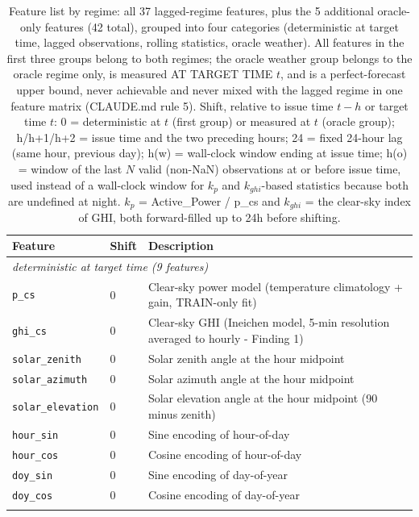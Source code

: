 \begin{table}[t]
  \centering
  \scriptsize
  \caption{Feature list by regime: all 37 lagged-regime features, plus the 5 additional oracle-only features (42 total), grouped into four categories (deterministic at target time, lagged observations, rolling statistics, oracle weather). All features in the first three groups belong to both regimes; the oracle weather group belongs to the oracle regime only, is measured AT TARGET TIME $t$, and is a perfect-forecast upper bound, never achievable and never mixed with the lagged regime in one feature matrix (CLAUDE.md rule 5). Shift, relative to issue time $t-h$ or target time $t$: 0 = deterministic at $t$ (first group) or measured at $t$ (oracle group); h/h+1/h+2 = issue time and the two preceding hours; 24 = fixed 24-hour lag (same hour, previous day); h(w) = wall-clock window ending at issue time; h(o) = window of the last $N$ valid (non-NaN) observations at or before issue time, used instead of a wall-clock window for $k_p$ and $k_{ghi}$-based statistics because both are undefined at night. $k_p$ = Active\_Power / p\_cs and $k_{ghi}$ = the clear-sky index of GHI, both forward-filled up to 24h before shifting.}
  \label{tab:T2}
  \begin{tabular}{ll p{4.5cm}}
    \toprule
    Feature & Shift & Description \\
    \midrule
    \multicolumn{3}{l}{\textit{deterministic at target time (9 features)}} \\
    \texttt{p\_cs} & 0 & Clear-sky power model (temperature climatology + gain, TRAIN-only fit) \\
    \texttt{ghi\_cs} & 0 & Clear-sky GHI (Ineichen model, 5-min resolution averaged to hourly - Finding 1) \\
    \texttt{solar\_zenith} & 0 & Solar zenith angle at the hour midpoint \\
    \texttt{solar\_azimuth} & 0 & Solar azimuth angle at the hour midpoint \\
    \texttt{solar\_elevation} & 0 & Solar elevation angle at the hour midpoint (90 minus zenith) \\
    \texttt{hour\_sin} & 0 & Sine encoding of hour-of-day \\
    \texttt{hour\_cos} & 0 & Cosine encoding of hour-of-day \\
    \texttt{doy\_sin} & 0 & Sine encoding of day-of-year \\
    \texttt{doy\_cos} & 0 & Cosine encoding of day-of-year \\
    \addlinespace

\end{tabular}
\end{table}
